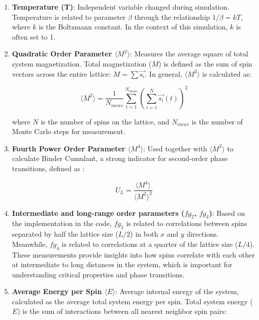 \begin{enumerate}
\item \textbf{Temperature (T)}: Independent variable changed during simulation. Temperature is related to parameter $\beta$ through the relationship $1/\beta = kT$, where $k$ is the Boltzmann constant. In the context of this simulation, $k$ is often set to 1.

\item \textbf{Quadratic Order Parameter $\langle M^2 \rangle$}: Measures the average square of total system magnetization. Total magnetization ($M$) is defined as the sum of spin vectors across the entire lattice: $M = \sum \vec{s_i}$. In general, $\langle M^2 \rangle$ is calculated as:

\begin{equation}
\langle M^2 \rangle = \frac{1}{N_{meas}} \sum_{t=1}^{N_{meas}} \left( \sum_{i=1}^{N} \vec{s_i}(t) \right)^2
\label{eq:magnetization}
\end{equation}

where $N$ is the number of spins on the lattice, and $N_{meas}$ is the number of Monte Carlo steps for measurement.

\item \textbf{Fourth Power Order Parameter $\langle M^4 \rangle$}: Used together with $\langle M^2 \rangle$ to calculate Binder Cumulant, a strong indicator for second-order phase transitions, defined as \cite{Jufrin2015}:

\begin{equation}
U_L = \frac{\langle M^4 \rangle}{\langle M^2 \rangle^2}
\label{eq:binder}
\end{equation}

\item \textbf{Intermediate and long-range order parameters ($fg_2$, $fg_4$)}: Based on the implementation in the code, $fg_2$ is related to correlations between spins separated by half the lattice size ($L/2$) in both $x$ and $y$ directions. Meanwhile, $fg_4$ is related to correlations at a quarter of the lattice size ($L/4$). These measurements provide insights into how spins correlate with each other at intermediate to long distances in the system, which is important for understanding critical properties and phase transitions.

\item \textbf{Average Energy per Spin $\langle E \rangle$}: Average internal energy of the system, calculated as the average total system energy per spin. Total system energy ($E$) is the sum of interactions between all nearest neighbor spin pairs:


\end{enumerate}
